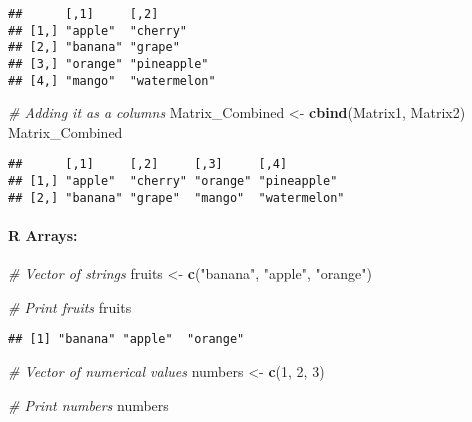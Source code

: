 \documentclass[
]{article}
\newenvironment{Shaded}{\begin{snugshade}}{\end{snugshade}}
\newcommand{\CommentTok}[1]{\textcolor[rgb]{0.56,0.35,0.01}{\textit{#1}}}
\newcommand{\DecValTok}[1]{\textcolor[rgb]{0.00,0.00,0.81}{#1}}
\newcommand{\FunctionTok}[1]{\textcolor[rgb]{0.13,0.29,0.53}{\textbf{#1}}}
\newcommand{\NormalTok}[1]{#1}
\newcommand{\OtherTok}[1]{\textcolor[rgb]{0.56,0.35,0.01}{#1}}
\newcommand{\StringTok}[1]{\textcolor[rgb]{0.31,0.60,0.02}{#1}}
\begin{document}
\begin{verbatim}
##      [,1]     [,2]        
## [1,] "apple"  "cherry"    
## [2,] "banana" "grape"     
## [3,] "orange" "pineapple" 
## [4,] "mango"  "watermelon"
\end{verbatim}

\begin{Shaded}
\begin{Highlighting}[]
\CommentTok{\# Adding it as a columns}
\NormalTok{Matrix\_Combined }\OtherTok{\textless{}{-}} \FunctionTok{cbind}\NormalTok{(Matrix1, Matrix2)}
\NormalTok{Matrix\_Combined}
\end{Highlighting}
\end{Shaded}

\begin{verbatim}
##      [,1]     [,2]     [,3]     [,4]        
## [1,] "apple"  "cherry" "orange" "pineapple" 
## [2,] "banana" "grape"  "mango"  "watermelon"
\end{verbatim}

\hypertarget{r-arrays}{%
\paragraph{R Arrays:}\label{r-arrays}}

\begin{Shaded}
\begin{Highlighting}[]
\CommentTok{\# Vector of strings}
\NormalTok{fruits }\OtherTok{\textless{}{-}} \FunctionTok{c}\NormalTok{(}\StringTok{"banana"}\NormalTok{, }\StringTok{"apple"}\NormalTok{, }\StringTok{"orange"}\NormalTok{)}

\CommentTok{\# Print fruits}
\NormalTok{fruits}
\end{Highlighting}
\end{Shaded}

\begin{verbatim}
## [1] "banana" "apple"  "orange"
\end{verbatim}

\begin{Shaded}
\begin{Highlighting}[]
\CommentTok{\# Vector of numerical values}
\NormalTok{numbers }\OtherTok{\textless{}{-}} \FunctionTok{c}\NormalTok{(}\DecValTok{1}\NormalTok{, }\DecValTok{2}\NormalTok{, }\DecValTok{3}\NormalTok{)}

\CommentTok{\# Print numbers}
\NormalTok{numbers}
\end{Highlighting}
\end{Shaded}
\end{document}
